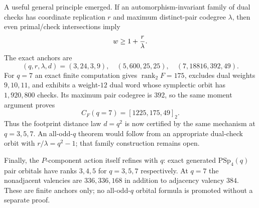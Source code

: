 A useful general principle emerged.  If an automorphism-invariant family of dual
checks has coordinate replication $r$ and maximum distinct-pair codegree
$\lambda$, then even primal/check intersections imply
\[
  w\ge1+{r\over\lambda}.
\]
The exact anchors are
\[
(q,r,\lambda,d)=(3,24,3,9),\quad(5,600,25,25),\quad
(7,18816,392,49).
\]
For $q=7$ an exact finite computation gives
$\operatorname{rank}_2F=175$, excludes dual weights $9,10,11$, and exhibits a
weight-$12$ dual word whose symplectic orbit has $1{,}920{,}800$ checks.  Its
maximum pair codegree is $392$, so the same moment argument proves
\[
 \boxed{C_F(q=7)=[1225,175,49]_2}.
\]
Thus the footprint distance law $d=q^2$ is now certified by the same mechanism
at $q=3,5,7$.  An all-odd-$q$ theorem would follow from an appropriate dual-check
orbit with $r/\lambda=q^2-1$; that family construction remains open.

Finally, the $P$-component action itself refines with $q$: exact generated
$\mathrm{PSp}_4(q)$ pair orbitals have ranks $3,4,5$ for $q=3,5,7$ respectively.
At $q=7$ the nonadjacent valencies are $336,336,168$ in addition to adjacency
valency $384$.  These are finite anchors only; no all-odd-$q$ orbital formula is
promoted without a separate proof.
